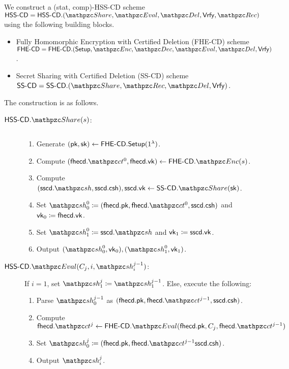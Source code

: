 We construct a (stat, comp)-HSS-CD scheme
$\HSScd = \HSScd.(\Sh, \Ev, \Del, \Vrfy, \Rec)$ using the following
building blocks.

\begin{itemize}
\item Fully Homomorphic Encryption with Certified Deletion (FHE-CD)
scheme $\FHEcd = \FHEcd.(\Setup, \qEnc, \qDec, \\
\Ev, \Del, \Vrfy)$.

\item Secret Sharing with Certified Deletion (SS-CD) scheme $\SScd =
\SScd.(\Sh, \Rec, \Del, \Vrfy)$.
\end{itemize}

The construction is as follows.

\begin{description}

\item[$\HSScd.\Sh(s)$:] $ $
\begin{enumerate}
    \item Generate $(\mathsf{pk}, \mathsf{sk}) \leftarrow \mathsf{FHE\textrm{-}CD}.\mathsf{Setup}(1^\lambda)$.
    \item Compute $(\fhecd.\qct^0, \fhecd.\vk) \leftarrow
        \FHEcd.\qEnc(s)$.
    \item Compute $(\sscd.\qsh, \sscd.\csh), \sscd.\vk
    \leftarrow \SScd.\Sh(\sk)$.
\item Set $\qsh_0^0 \seteq (\fhecd.\pk, \fhecd.\qct^0, \sscd.\csh)$
and $\mathsf{vk}_0 \coloneqq \mathsf{fhe}\mathsf{cd}.\mathsf{vk}$.
\item Set $\qsh_1^0 \seteq \sscd.\qsh$ and $\mathsf{vk}_1 \coloneqq \mathsf{ss}\mathsf{cd}.\mathsf{vk}$.
\item Output $(\qsh_0^0, \vk_0), (\qsh_1^0, \vk_1)$.
\end{enumerate}

\item[$\HSScd.\Ev(C_j, i, \qsh_i^{j-1})$:] If $i = 1$, set
$\qsh_1^{j} \seteq \qsh_1^{j-1}$. Else, execute the following:
\begin{enumerate}
\item Parse $\qsh_{0}^{j-1}$ as $(\fhecd.\pk, \fhecd.\qct^{j-1},
\sscd.\csh)$.
\item Compute $\fhecd.\qct^j \leftarrow \FHEcd.\Ev(\fhecd.\pk, C_j,
\fhecd.\qct^{j-1})$
\item Set $\qsh_0^{j} \seteq (\fhecd.\pk, \fhecd.\qct^{j-1}
\sscd.\csh)$.
\item Output $\qsh_i^j$.
\end{enumerate}


\end{description}
